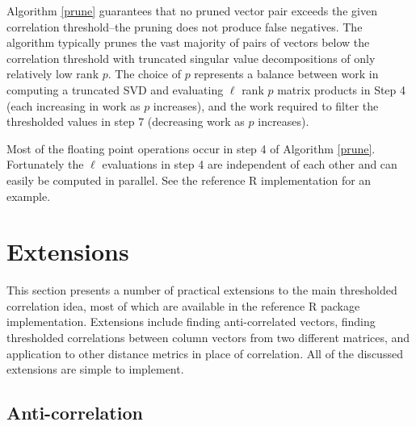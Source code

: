 \documentclass{article}
\let\proglang=\textsf
\numberwithin{algorithmctr}{section}
\begin{document}
Algorithm \ref{prune} guarantees that no pruned vector pair exceeds the given
correlation threshold--the pruning does not produce false negatives.  The
algorithm typically prunes the vast majority of pairs of vectors below the
correlation threshold with truncated singular value decompositions of only
relatively low rank $p$.  The choice of $p$ represents a balance between work
in computing a truncated SVD and evaluating $\ell$ rank $p$ matrix products in
Step 4 (each increasing in work as $p$ increases), and the work required to
filter the thresholded values in step 7 (decreasing work as $p$ increases).

Most of the floating point operations occur in step 4 of Algorithm \ref{prune}.
Fortunately the $\ell$ evaluations in step 4 are independent of each other and
can easily be computed in parallel. See the reference \proglang{R}
implementation \cite{sup} for an example.

\section{Extensions}\label{extensions}

This section presents a number of practical extensions to the main thresholded
correlation idea, most of which are available in the reference R package
implementation. Extensions include finding anti-correlated vectors, finding
thresholded correlations between column vectors from two different matrices,
and application to other distance metrics in place of correlation. All of the
discussed extensions are simple to implement.

\subsection{Anti-correlation}
\end{document}
